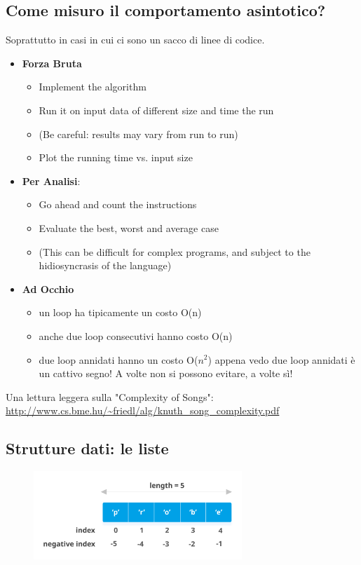 \subsection{Come misuro il comportamento asintotico?}
Soprattutto in casi in cui ci sono un sacco di linee di codice.
\begin{itemize}
    \item \textbf{Forza Bruta}
        \begin{itemize}
        \item Implement the algorithm
        \item Run it on input data of different size and time the run
        \item (Be careful: results may vary from run to run)
        \item Plot the running time vs. input size
    \end{itemize}
    \item \textbf{Per Analisi}:
        \begin{itemize}
        \item Go ahead and count the instructions
        \item Evaluate the best, worst and average case
        \item (This can be difficult for complex programs, and subject to the
      hidiosyncrasis of the language)
    \end{itemize}

    \item \textbf{Ad Occhio}
        \begin{itemize}
        \item un loop ha tipicamente un costo O(n)
        \item anche due loop consecutivi hanno costo O(n)
        \item due loop annidati hanno un costo O($n^2$) appena vedo due loop annidati è un cattivo segno! A volte non si possono evitare, a volte sì!
        \end{itemize}
\end{itemize}


Una lettura leggera sulla "Complexity of Songs": \url{http://www.cs.bme.hu/~friedl/alg/knuth_song_complexity.pdf}

\subsection{Strutture dati: le liste}

\begin{figure}[ht]
    \centering
    \includegraphics[width=0.7\textwidth]{lez3/list.png}
    \caption{ }
    \label{list}
\end{figure}
\FloatBarrier

